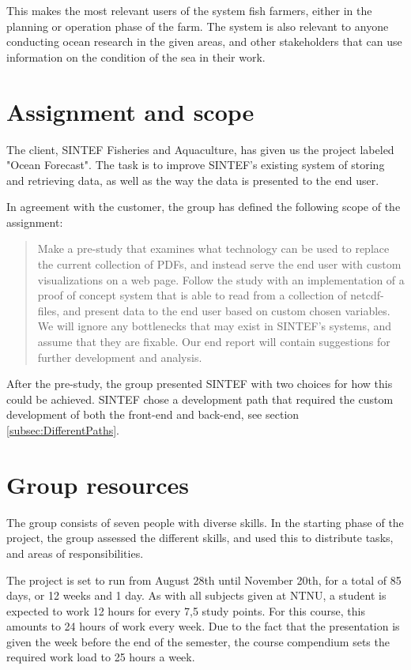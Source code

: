 \documentclass[11pt,a4paper,titlepage,oneside]{report}
\begin{document}
This makes the most relevant users of the system fish farmers, either in the planning or operation phase of the farm. The system is also relevant to anyone conducting ocean research in the given areas, and other stakeholders that can use information on the condition of the sea in their work.

\section{Assignment and scope}
\label{sec:AssignmentScope}
The client, SINTEF Fisheries and Aquaculture, has given us the project labeled "Ocean Forecast". The task is to improve SINTEF's existing system of storing and retrieving data, as well as the way the data is presented to the end user. 

In agreement with the customer, the group has defined the following scope of the assignment:

\begin{quote}
Make a \gls{pre-study} that examines what technology can be used to replace the current collection of PDFs, and instead serve the end user with custom visualizations on a web page. Follow the study with an implementation of a \gls{proof of concept} system that is able to read from a collection of \gls{netcdf}-files, and present data to the end user based on custom chosen variables. We will ignore any bottlenecks that may exist in SINTEF's systems, and assume that they are fixable. Our end report will contain suggestions for further development and analysis.
\end{quote}

After the \gls{pre-study}, the group presented SINTEF with two choices for how this could be achieved. SINTEF chose a development path that required the custom development of both the \gls{front-end} and \gls{back-end}, see section \ref{subsec:DifferentPaths}.

\section{Group resources}
\label{sec:GroupResources}
The group consists of seven people with diverse skills. In the starting phase of the project, the group assessed the different skills, and used this to distribute tasks, and areas of responsibilities. 

The project is set to run from August 28th until November 20th, for a total of 85 days, or 12 weeks and 1 day. As with all subjects given at \gls{NTNU}, a student is expected to work 12 hours for every 7,5 study points. For this course, this amounts to 24 hours of work every week. Due to the fact that the presentation is given the week before the end of the semester, the \gls{course compendium} sets the required work load to 25 hours a week. 
\end{document}

